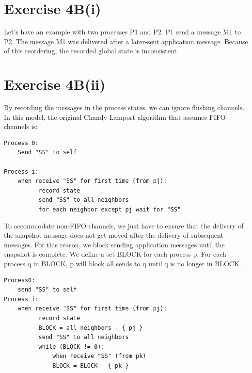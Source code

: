 \section*{Exercise 4B(i)}
Let's have an example with two processes P1 and P2. P1 send a message
M1 to P2. The message M1 was delivered after a later-sent application
message. Because of this reordering, the recorded global state is
inconsistent

\section*{Exercise 4B(ii)}
By recording the messages in the process states, we can ignore
flushing channels. In this model, the original Chandy-Lamport
algorithm that assumes FIFO channels is:

\begin{lstlisting}[style=mycode]
Process 0: 
	Send "SS" to self

Process i: 
	when receive "SS" for first time (from pj):
		  record state
		  send "SS" to all neighbors
		  for each neighbor except pj wait for "SS"
\end{lstlisting}

To accommodate non-FIFO channels, we just have to ensure that the
delivery of the snapshot message does not get moved after the delivery
of subsequent messages. For this reason, we block sending application
messages until the snapshot is complete. We define a set BLOCK for
each process p. For each process q in BLOCK, p will block all sends to
q until q is no longer in BLOCK.

\begin{lstlisting}[style=mycode]
Process0: 
	send "SS" to self
Process i: 
	when receive "SS" for first time (from pj):
		  record state
		  BLOCK = all neighbors - { pj }
		  send "SS" to all neighbors
		  while (BLOCK != 0):
			  when receive "SS" (from pk)
			  BLOCK = BLOCK - { pk }
\end{lstlisting}

